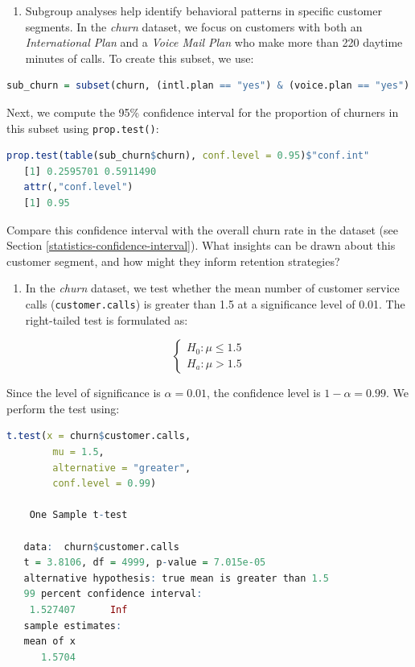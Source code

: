 \documentclass[
]{book}
\newcommand{\passthrough}[1]{#1}
\providecommand{\tightlist}{%
  \setlength{\itemsep}{0pt}\setlength{\parskip}{0pt}}
\theoremstyle{definition}
\theoremstyle{definition}
\theoremstyle{definition}
\theoremstyle{definition}
\theoremstyle{remark}
\begin{document}
\begin{enumerate}
\def\labelenumi{\arabic{enumi}.}
\setcounter{enumi}{10}
\tightlist
\item
  Subgroup analyses help identify behavioral patterns in specific customer segments. In the \emph{churn} dataset, we focus on customers with both an \emph{International Plan} and a \emph{Voice Mail Plan} who make more than 220 daytime minutes of calls. To create this subset, we use:
\end{enumerate}

\begin{lstlisting}[language=R]
sub_churn = subset(churn, (intl.plan == "yes") & (voice.plan == "yes") & (day.mins > 220)) 
\end{lstlisting}

Next, we compute the 95\% confidence interval for the proportion of churners in this subset using \passthrough{\lstinline!prop.test()!}:

\begin{lstlisting}[language=R]
prop.test(table(sub_churn$churn), conf.level = 0.95)$"conf.int"
   [1] 0.2595701 0.5911490
   attr(,"conf.level")
   [1] 0.95
\end{lstlisting}

Compare this confidence interval with the overall churn rate in the dataset (see Section \ref{statistics-confidence-interval}). What insights can be drawn about this customer segment, and how might they inform retention strategies?

\begin{enumerate}
\def\labelenumi{\arabic{enumi}.}
\setcounter{enumi}{11}
\tightlist
\item
  In the \emph{churn} dataset, we test whether the mean number of customer service calls (\passthrough{\lstinline!customer.calls!}) is greater than 1.5 at a significance level of 0.01. The right-tailed test is formulated as:
\end{enumerate}

\[
\begin{cases}
  H_0:  \mu \leq 1.5 \\
  H_a:  \mu > 1.5
\end{cases}
\]

Since the level of significance is \(\alpha = 0.01\), the confidence level is \(1-\alpha = 0.99\). We perform the test using:

\begin{lstlisting}[language=R]
t.test(x = churn$customer.calls, 
        mu = 1.5, 
        alternative = "greater", 
        conf.level = 0.99)
   
    One Sample t-test
   
   data:  churn$customer.calls
   t = 3.8106, df = 4999, p-value = 7.015e-05
   alternative hypothesis: true mean is greater than 1.5
   99 percent confidence interval:
    1.527407      Inf
   sample estimates:
   mean of x 
      1.5704
\end{lstlisting}
\end{document}
